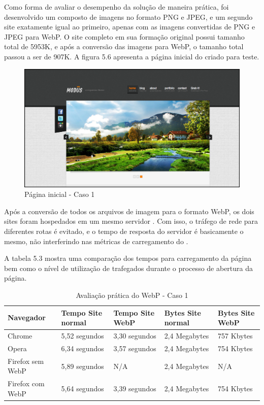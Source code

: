 \documentclass[espaco=simples,appendix=Name]{abnt}
\begin{document}
Como forma de avaliar o desempenho da solução de maneira prática, foi desenvolvido um  composto de imagens no formato PNG e JPEG, e um segundo site exatamente igual ao primeiro, apenas com as imagens convertidas de PNG e JPEG para WebP. O site completo em sua formação original possui tamanho total de 5953K, e após a conversão das imagens para WebP, o tamanho total passou a ser de 907K. A figura 5.6 apresenta a página inicial do  criado para teste.

\begin{figure}[H]
  \centering
    \includegraphics[scale=0.25]{site1.png}
  \caption{Página inicial - Caso 1}
\end{figure}

Após a conversão de todos os arquivos de imagem para o formato WebP, os dois sites foram hospedados em um mesmo servidor . Com isso, o tráfego de rede para diferentes rotas é evitado, e o tempo de resposta do servidor é basicamente o mesmo, não interferindo nas métricas de carregamento do . 

A tabela 5.3 mostra uma comparação dos tempos para carregamento da página bem como o nível de utilização de  trafegados durante o processo de abertura da página.

\begin{table}[ht]
        \centering
        \caption{Avaliação prática do WebP - Caso 1
        \label{tbl:padc}}{
                \begin{tabular}{|l|p{3cm}|p{3cm}|l|p{2cm}|}
                \hline
                        \textbf{Navegador} & \textbf{Tempo Site normal} & \textbf{Tempo Site WebP} & \textbf{Bytes Site normal} & \textbf{Bytes Site WebP} \\
                        \hline
                        Chrome			&  5,52 segundos	& 3,30 segundos		& 2,4 Megabytes		& 757 Kbytes \\
                        \hline
						Opera			&  6,34 segundos	& 3,57 segundos		& 2,4 Megabytes		& 754 Kbytes \\
						\hline
                        Firefox sem WebP	&  5,89 segundos	& N/A			& 2,4 Megabytes		& N/A \\
                        \hline
                        Firefox com WebP	&  5,64 segundos	& 3,39 segundos		& 2,4 Megabytes		& 754 Kbytes \\
                        \hline
                \end{tabular}
                }
\end{table}
\end{document}
